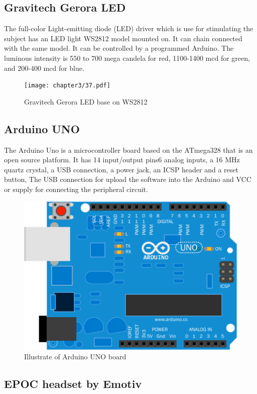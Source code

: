 \subsection{Gravitech Gerora LED\cite{ref13}}

\hspace{1.5cm} The full-color Light-emitting diode (LED) driver which is use for stimulating the subject has an LED light WS2812 model mounted on. It can chain connected with the same model. It can be controlled by a programmed Arduino. The luminous intensity is 550 to 700 mega candela for red, 1100-1400 mcd for green, and 200-400 mcd for blue.
\begin{figure}[ht]
	\centering
	\texttt{[image: chapter3/37.pdf]}
	\caption{Gravitech Gerora LED base on WS2812}
\end{figure}

\subsection{Arduino UNO\cite{ref14}}

\hspace{1.5cm} The Arduino Uno is a microcontroller board based on the ATmega328 that is an open source platform. It has 14 input/output pins6 analog inputs, a 16 MHz quartz crystal, a USB connection, a power jack, an ICSP header and a reset button, The USB connection for upload the software into the Arduino and VCC or supply for connecting the peripheral circuit.   
\begin{figure}[ht]
	\centering
	\includegraphics[scale = 0.8]{chapter3/38.pdf}
	\caption{Illustrate of Arduino UNO board}
\end{figure}

\subsection{EPOC headset by Emotiv\texttrademark\cite{ref12}}


